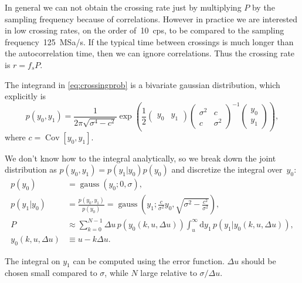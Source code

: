 In general we can not obtain the crossing rate just by multiplying $P$ by the
sampling frequency because of correlations. However in practice we are
interested in low crossing rates, on the order of~\SI{10}{cps}, to be compared
to the sampling frequency~\SI{125}{MSa/s}. If the typical time between
crossings is much longer than the autocorrelation time, then we can ignore
correlations. Thus the crossing rate is $r = f_s P$.


The integrand in \autoref{eq:crossingprob} is a bivariate gaussian
distribution, which explicitly is
%
\begin{equation}
    p(y_0,y_1) =
    \frac 1 {2\pi \sqrt{\sigma^4 - c^2}}
    \exp \left(
    \frac 1 2
    \begin{pmatrix}
        y_0 & y_1
    \end{pmatrix}
    \begin{pmatrix}
        \sigma^2 & c \\
        c & \sigma^2
    \end{pmatrix}^{-1}
    \begin{pmatrix}
        y_0 \\ y_1
    \end{pmatrix}
    \right),
\end{equation}
%
where $c = \operatorname{Cov}[y_0, y_1]$.

We don't know how to the integral analytically, so we break down the joint
distribution as $p(y_0,y_1) = p(y_1|y_0) p(y_0)$ and discretize the integral
over~$y_0$:
%
\begin{align}
    p(y_0) &= \operatorname{gauss}(y_0; 0, \sigma), \\
    p(y_1|y_0) &= \frac {p(y_0, y_1)} {p(y_0)}
    = \operatorname{gauss} \left(
        y_1; \frac c {\sigma^2} y_0, \sqrt{\sigma^2 - \frac {c^2} {\sigma^2}}
    \right), \\
    P &\approx
    \sum_{k=0}^{N-1} \Delta u\, p(y_0(k,u,\Delta u))
    \int_u^\infty \mathrm d y_1\, p(y_1|y_0(k,u,\Delta u)), \label{eq:rdisc} \\
    y_0(k,u,\Delta u) &\equiv u - k \Delta u.
\end{align}

The integral on $y_1$ can be computed using the error function. $\Delta u$
should be chosen small compared to $\sigma$, while $N$ large relative to
$\sigma / \Delta u$.

